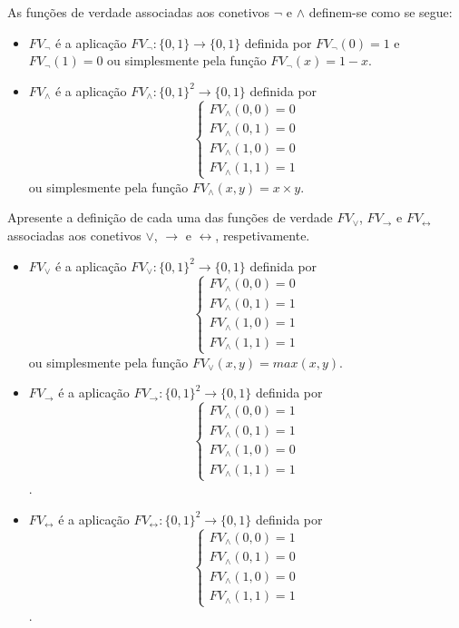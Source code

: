 As funções de verdade associadas aos conetivos $\neg$ e $\land$ definem-se como se segue:

\begin{itemize}
    \item $FV_\neg$ é a aplicação $FV_\neg:\{0,1\}\to\{0,1\}$ definida por $FV_\neg(0)=1$ e $FV_\neg(1)=0$ ou simplesmente pela função $FV_\neg(x)=1-x$.
    \item $FV_\land$ é a aplicação $FV_\land:\{0,1\}^2\to\{0,1\}$ definida por \[
        \begin{cases}
            FV_\land(0,0)=0 \\
            FV_\land(0,1)=0 \\
            FV_\land(1,0)=0 \\
            FV_\land(1,1)=1
        \end{cases}\] ou simplesmente pela função $FV_\land(x,y)=x\times y$.
\end{itemize}

\begin{exercises}
    Apresente a definição de cada uma das funções de verdade $FV_\lor$, $FV_\to$ e $FV_\leftrightarrow$ associadas aos conetivos $\lor$, $\to$ e $\leftrightarrow$, respetivamente.

    \begin{itemize}
        \item $FV_\lor$ é a aplicação $FV_\lor:\{0,1\}^2\to\{0,1\}$ definida por \[
            \begin{cases}
                FV_\land(0,0)=0 \\
                FV_\land(0,1)=1 \\
                FV_\land(1,0)=1 \\
                FV_\land(1,1)=1
            \end{cases}\] ou simplesmente pela função $FV_\lor(x,y)=max(x, y)$.
        \item $FV_\to$ é a aplicação $FV_{\to}:\{0,1\}^2\to\{0,1\}$ definida por \[
            \begin{cases}
                FV_\land(0,0)=1 \\
                FV_\land(0,1)=1 \\
                FV_\land(1,0)=0 \\
                FV_\land(1,1)=1
            \end{cases}\].
        \item $FV_\leftrightarrow$ é a aplicação $FV_{\leftrightarrow}:\{0,1\}^2\to\{0,1\}$ definida por \[
            \begin{cases}
                FV_\land(0,0)=1 \\
                FV_\land(0,1)=0 \\
                FV_\land(1,0)=0 \\
                FV_\land(1,1)=1
            \end{cases}\].
    \end{itemize}
\end{exercises}

